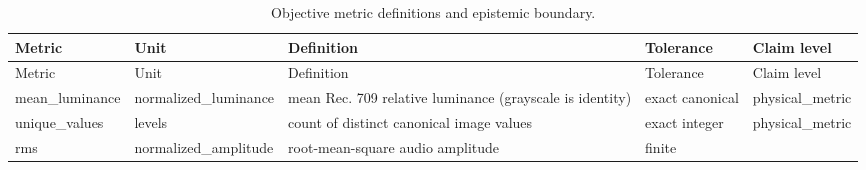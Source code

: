 \documentclass[
  english,
]{article}
\begin{document}
\begin{longtable}[]{@{}
  >{\raggedright\arraybackslash}p{}
  >{\raggedright\arraybackslash}p{}
  >{\raggedright\arraybackslash}p{}
  >{\raggedright\arraybackslash}p{}
  >{\raggedright\arraybackslash}p{}@{}}
\caption{Objective metric definitions and epistemic
boundary.}\label{tbl:metrics}\tabularnewline
\toprule\noalign{}
\begin{minipage}[b]{\linewidth}\raggedright
Metric
\end{minipage} & \begin{minipage}[b]{\linewidth}\raggedright
Unit
\end{minipage} & \begin{minipage}[b]{\linewidth}\raggedright
Definition
\end{minipage} & \begin{minipage}[b]{\linewidth}\raggedright
Tolerance
\end{minipage} & \begin{minipage}[b]{\linewidth}\raggedright
Claim level
\end{minipage} \\
\midrule\noalign{}
\endfirsthead
\toprule\noalign{}
\begin{minipage}[b]{\linewidth}\raggedright
Metric
\end{minipage} & \begin{minipage}[b]{\linewidth}\raggedright
Unit
\end{minipage} & \begin{minipage}[b]{\linewidth}\raggedright
Definition
\end{minipage} & \begin{minipage}[b]{\linewidth}\raggedright
Tolerance
\end{minipage} & \begin{minipage}[b]{\linewidth}\raggedright
Claim level
\end{minipage} \\
\midrule\noalign{}
\endhead
\bottomrule\noalign{}
\endlastfoot
mean\_luminance & normalized\_luminance & mean Rec. 709 relative
luminance (grayscale is identity) & exact canonical &
physical\_metric \\
unique\_values & levels & count of distinct canonical image values &
exact integer & physical\_metric \\
rms & normalized\_amplitude & root-mean-square audio amplitude & finite

\end{longtable}
\end{document}
